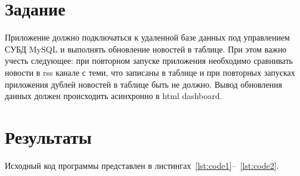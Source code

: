 \documentclass[a4paper, 14pt]{extarticle}
\begin{document}
	\renewcommand{\ttdefault}{pcr}
	
	\setlength{\tabcolsep}{3pt}
	\newpage
	\setcounter{page}{2}
	
	\section{Задание}\label{Sect::task}
	
Приложение должно подключаться к удаленной базе данных под управлением СУБД MySQL и выполнять обновление новостей в таблице. При этом важно учесть следующее: при повторном запуске приложения необходимо сравнивать новости в rss канале с теми, что записаны в таблице и при повторных запусках приложения дублей новостей в таблице быть не должно. Вывод обновления данных должен происходить асинхронно в html dashboard.
	\section{Результаты}\label{Sect::res}
	Исходный код программы представлен в листингах~\ref{lst:code1}--~\ref{lst:code2}.
	
\end{document}
